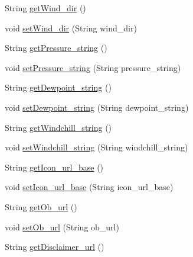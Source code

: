 \begin{DoxyCompactItemize}
\item 
String \hyperlink{classgov_1_1fnal_1_1ppd_1_1dd_1_1testing_1_1news_1_1current__observation_a044e15008b8c8a1f2407a0f90c92a311}{get\-Wind\-\_\-dir} ()
\item 
void \hyperlink{classgov_1_1fnal_1_1ppd_1_1dd_1_1testing_1_1news_1_1current__observation_a48667b66cdfa74e201ae356b83d32ddf}{set\-Wind\-\_\-dir} (String wind\-\_\-dir)
\item 
String \hyperlink{classgov_1_1fnal_1_1ppd_1_1dd_1_1testing_1_1news_1_1current__observation_a18a0d101902ae1a78704ab9484d5bb6d}{get\-Pressure\-\_\-string} ()
\item 
void \hyperlink{classgov_1_1fnal_1_1ppd_1_1dd_1_1testing_1_1news_1_1current__observation_af36f95a105dc70f43a2d7ee8c3a30854}{set\-Pressure\-\_\-string} (String pressure\-\_\-string)
\item 
String \hyperlink{classgov_1_1fnal_1_1ppd_1_1dd_1_1testing_1_1news_1_1current__observation_a50967c618be015b0452c27ff4a52bbea}{get\-Dewpoint\-\_\-string} ()
\item 
void \hyperlink{classgov_1_1fnal_1_1ppd_1_1dd_1_1testing_1_1news_1_1current__observation_a26b90a62964de65482151db03576d4c7}{set\-Dewpoint\-\_\-string} (String dewpoint\-\_\-string)
\item 
String \hyperlink{classgov_1_1fnal_1_1ppd_1_1dd_1_1testing_1_1news_1_1current__observation_aa90b4fdec15f792b889fa2fec1ff0a15}{get\-Windchill\-\_\-string} ()
\item 
void \hyperlink{classgov_1_1fnal_1_1ppd_1_1dd_1_1testing_1_1news_1_1current__observation_a812709ee0b78611def6bb6ce4f2fc38a}{set\-Windchill\-\_\-string} (String windchill\-\_\-string)
\item 
String \hyperlink{classgov_1_1fnal_1_1ppd_1_1dd_1_1testing_1_1news_1_1current__observation_a29985cf597f52769d691e670f67d5c59}{get\-Icon\-\_\-url\-\_\-base} ()
\item 
void \hyperlink{classgov_1_1fnal_1_1ppd_1_1dd_1_1testing_1_1news_1_1current__observation_a1cf9797d24ba8139cea1d0cc6dbb1436}{set\-Icon\-\_\-url\-\_\-base} (String icon\-\_\-url\-\_\-base)
\item 
String \hyperlink{classgov_1_1fnal_1_1ppd_1_1dd_1_1testing_1_1news_1_1current__observation_aa72e84c7dc732a8696fa579757028b8e}{get\-Ob\-\_\-url} ()
\item 
void \hyperlink{classgov_1_1fnal_1_1ppd_1_1dd_1_1testing_1_1news_1_1current__observation_a4eeca65a8966ad0b16101e53d2a1ace1}{set\-Ob\-\_\-url} (String ob\-\_\-url)
\item 
String \hyperlink{classgov_1_1fnal_1_1ppd_1_1dd_1_1testing_1_1news_1_1current__observation_ac181f516cde0d13fa773e3069f30a533}{get\-Disclaimer\-\_\-url} ()

\end{DoxyCompactItemize}
